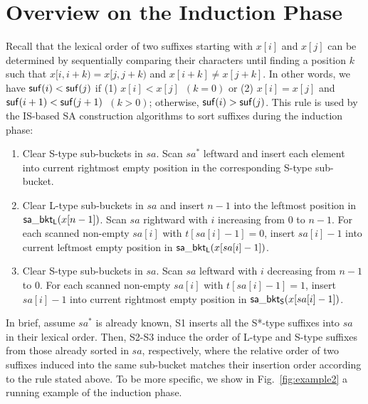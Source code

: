 \documentclass[10pt,journal,compsoc]{IEEEtran}
\begin{document}
\appendices
\section{Overview on the Induction Phase} \label{sec:appendix}

Recall that the lexical order of two suffixes starting with $x[i]$ and $x[j]$ can be determined by sequentially comparing their characters until finding a position $k$ such that $x[i, i + k) = x[j, j + k)$ and $x[i + k] \ne x[j + k]$. In other words, we have ${\sf suf}(i) < {\sf suf}(j)$ if (1) $x[i] < x[j]$~$(k = 0)$ or (2) $x[i] = x[j]$ and ${\sf suf}(i + 1) < {\sf suf}(j + 1)$~$(k > 0)$; otherwise, ${\sf suf}(i) > {\sf suf}(j)$. This rule is used by the IS-based SA construction algorithms to sort suffixes during the induction phase:

\begin{enumerate}[S1]
	\item 
	Clear S-type sub-buckets in $sa$. Scan $sa^*$ leftward and insert each element into current rightmost empty position in the corresponding S-type sub-bucket.
	
	\item 
	Clear L-type sub-buckets in $sa$ and insert $n - 1$ into the leftmost position in ${\sf sa\_bkt_L}(x[n - 1])$. Scan $sa$ rightward with $i$ increasing from $0$ to $n - 1$. For each scanned non-empty $sa[i]$ with $t[sa[i] - 1] = 0$, insert $sa[i] - 1$ into current leftmost empty position in ${\sf sa\_bkt_L}(x[sa[i] - 1])$.
	
	\item
	Clear S-type sub-buckets in $sa$. Scan $sa$ leftward with $i$ decreasing from $n - 1$ to $0$. For each scanned non-empty $sa[i]$ with $t[sa[i] - 1] = 1$, insert $sa[i] - 1$ into current rightmost empty position in ${\sf sa\_bkt_S}(x[sa[i] - 1])$.
	
\end{enumerate}

In brief, assume $sa^*$ is already known, S1 inserts all the S*-type suffixes into $sa$ in their lexical order. Then, S2-S3 induce the order of L-type and S-type suffixes from those already sorted in $sa$, respectively, where the relative order of two suffixes induced into the same sub-bucket matches their insertion order according to the rule stated above. To be more specific, we show in Fig.~\ref{fig:example2} a running example of the induction phase. 
\end{document}
